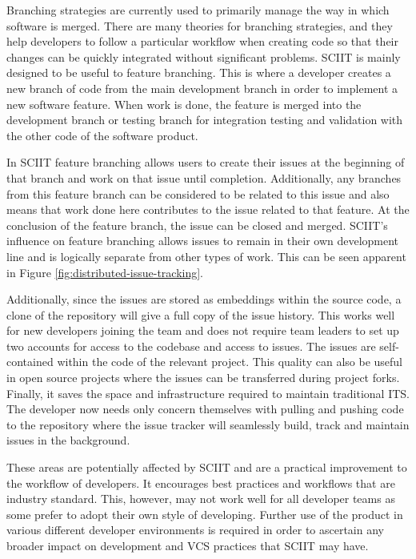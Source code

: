\documentclass{mproj}
\begin{document}
Branching strategies are currently used to primarily manage the way in which software is merged. There are many theories for branching strategies, and they help developers to follow a particular workflow when creating code so that their changes can be quickly integrated without significant problems. SCIIT is mainly designed to be useful to feature branching. This is where a developer creates a new branch of code from the main development branch in order to implement a new software feature. When work is done, the feature is merged into the development branch or testing branch for integration testing and validation with the other code of the software product.

In SCIIT feature branching allows users to create their issues at the beginning of that branch and work on that issue until completion. Additionally, any branches from this feature branch can be considered to be related to this issue and also means that work done here contributes to the issue related to that feature. At the conclusion of the feature branch, the issue can be closed and merged. SCIIT’s influence on feature branching allows issues to remain in their own development line and is logically separate from other types of work. This can be seen apparent in Figure \ref{fig:distributed-issue-tracking}.


Additionally, since the issues are stored as embeddings within the source code, a clone of the repository will give a full copy of the issue history. This works well for new developers joining the team and does not require team leaders to set up two accounts for access to the codebase and access to issues. The issues are self-contained within the code of the relevant project. This quality can also be useful in open source projects where the issues can be transferred during project forks. Finally, it saves the space and infrastructure required to maintain traditional ITS. The developer now needs only concern themselves with pulling and pushing code to the repository where the issue tracker will seamlessly build, track and maintain issues in the background.

These areas are potentially affected by SCIIT and are a practical improvement to the workflow of developers. It encourages best practices and workflows that are industry standard. This, however, may not work well for all developer teams as some prefer to adopt their own style of developing. Further use of the product in various different developer environments is required in order to ascertain any broader impact on development and VCS practices that SCIIT may have.
\end{document}
